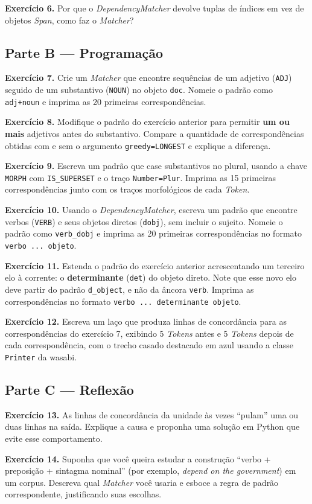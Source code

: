 \documentclass[
  brazilian,
]{article}
\begin{document}
\textbf{Exercício 6.} Por que o \emph{DependencyMatcher} devolve tuplas
de índices em vez de objetos \emph{Span}, como faz o \emph{Matcher}?

\hypertarget{parte-b-programauxe7uxe3o}{%
\subsection{Parte B --- Programação}\label{parte-b-programauxe7uxe3o}}

\textbf{Exercício 7.} Crie um \emph{Matcher} que encontre sequências de
um adjetivo (\texttt{ADJ}) seguido de um substantivo (\texttt{NOUN}) no
objeto \texttt{doc}. Nomeie o padrão como \texttt{adj+noun} e imprima as
20 primeiras correspondências.

\textbf{Exercício 8.} Modifique o padrão do exercício anterior para
permitir \textbf{um ou mais} adjetivos antes do substantivo. Compare a
quantidade de correspondências obtidas com e sem o argumento
\texttt{greedy=\textquotesingle{}LONGEST\textquotesingle{}} e explique a
diferença.

\textbf{Exercício 9.} Escreva um padrão que case substantivos no plural,
usando a chave \texttt{MORPH} com \texttt{IS\_SUPERSET} e o traço
\texttt{Number=Plur}. Imprima as 15 primeiras correspondências junto com
os traços morfológicos de cada \emph{Token}.

\textbf{Exercício 10.} Usando o \emph{DependencyMatcher}, escreva um
padrão que encontre verbos (\texttt{VERB}) e seus objetos diretos
(\texttt{dobj}), sem incluir o sujeito. Nomeie o padrão como
\texttt{verb\_dobj} e imprima as 20 primeiras correspondências no
formato \texttt{verbo\ ...\ objeto}.

\textbf{Exercício 11.} Estenda o padrão do exercício anterior
acrescentando um terceiro elo à corrente: o \textbf{determinante}
(\texttt{det}) do objeto direto. Note que esse novo elo deve partir do
padrão \texttt{d\_object}, e não da âncora \texttt{verb}. Imprima as
correspondências no formato \texttt{verbo\ ...\ determinante\ objeto}.

\textbf{Exercício 12.} Escreva um laço que produza linhas de
concordância para as correspondências do exercício 7, exibindo 5
\emph{Tokens} antes e 5 \emph{Tokens} depois de cada correspondência,
com o trecho casado destacado em azul usando a classe \texttt{Printer}
da wasabi.

\hypertarget{parte-c-reflexuxe3o}{%
\subsection{Parte C --- Reflexão}\label{parte-c-reflexuxe3o}}

\textbf{Exercício 13.} As linhas de concordância da unidade às vezes
``pulam'' uma ou duas linhas na saída. Explique a causa e proponha uma
solução em Python que evite esse comportamento.

\textbf{Exercício 14.} Suponha que você queira estudar a construção
``verbo + preposição + sintagma nominal'' (por exemplo, \emph{depend on
the government}) em um corpus. Descreva qual \emph{Matcher} você usaria
e esboce a regra de padrão correspondente, justificando suas escolhas.
\end{document}
